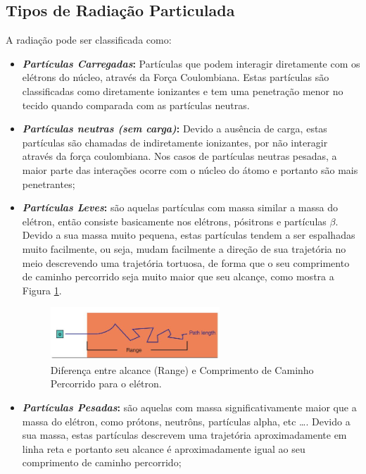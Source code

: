 \documentclass[11pt,a4paper]{article}
\begin{document}
       \subsection{Tipos de Radiação Particulada}

            A radiação pode ser classificada como:

            \begin{itemize}
                \item \textbf{\textit{\textcolor{CarnationPink}{Partículas Carregadas}}:} Partículas que podem interagir diretamente com os elétrons do núcleo, através da Força Coulombiana. Estas partículas são classificadas como diretamente ionizantes e tem uma penetração menor no tecido quando comparada com as partículas neutras.
                
                \item \textbf{\textit{\textcolor{CarnationPink}{Partículas neutras (sem carga)}}:}  Devido a ausência de carga, estas partículas são chamadas de indiretamente ionizantes, por não interagir através da força coulombiana. Nos casos de partículas neutras pesadas, a maior parte das interações ocorre com o núcleo do átomo e portanto são mais penetrantes; 
                
                \item \textbf{\textit{\textcolor{CarnationPink}{Partículas Leves}}:} são aquelas partículas com massa similar a massa do elétron, então consiste basicamente nos elétrons, pósitrons e partículas $\beta$. Devido a sua massa muito pequena, estas partículas tendem a ser espalhadas muito facilmente, ou seja, mudam facilmente a direção de sua trajetória no meio descrevendo uma trajetória tortuosa, de forma que o seu comprimento de caminho percorrido  seja muito maior que seu alcançe, como mostra a Figura \ref{fig:alcanceECaminhoPercorrido}.

                    \begin{figure}[h]
                        \centering
                        \includegraphics[width=0.6\textwidth]{Imagens/alcanceECaminhoPercorrido.JPG}
                        \caption{Diferença entre alcance (Range) e Comprimento de Caminho Percorrido para o elétron.}
                        \label{fig:alcanceECaminhoPercorrido}
                    \end{figure}

                \item \textbf{\textit{\textcolor{CarnationPink}{Partículas Pesadas}}:} são aquelas com massa significativamente maior que a massa do elétron, como prótons, neutrôns, partículas alpha, etc \dots. Devido a sua massa, estas partículas descrevem uma trajetória aproximadamente em linha reta e portanto seu alcance é aproximadamente igual ao seu comprimento de caminho percorrido; 

            \end{itemize}
\end{document}
